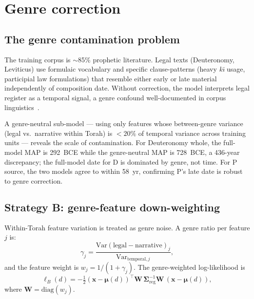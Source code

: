 \documentclass[10pt,letterpaper]{article}
\newcommand{\Smat}{\boldsymbol{\Sigma}}
\newcommand{\muvec}{\boldsymbol{\mu}}
\newcommand{\xvec}{\mathbf{x}}
\begin{document}
\section*{Genre correction}

\subsection*{The genre contamination problem}

The training corpus is $\sim$85\% prophetic literature.  Legal texts
(Deuteronomy, Leviticus) use formulaic vocabulary and specific
clause-patterns (heavy \textit{k\={\i}} usage, participial law formulations)
that resemble either early or late material independently of composition date.
Without correction, the model interprets legal register as a temporal signal, a genre confound well-documented in corpus linguistics~\cite{Biber1988,Biber2009}.

A genre-neutral sub-model --- using only features whose between-genre variance
(legal vs.\ narrative within Torah) is $< 20\%$ of temporal variance across
training units --- reveals the scale of contamination.  For Deuteronomy
whole, the full-model MAP is 292~BCE while the genre-neutral MAP is 728~BCE,
a 436-year discrepancy; the full-model date for D is dominated by genre,
not time.  For P source, the two models agree to within 58~yr, confirming
P's late date is robust to genre correction.

\subsection*{Strategy B: genre-feature down-weighting}

Within-Torah feature variation is treated as genre noise.  A genre ratio
per feature $j$ is:
%
\begin{equation}
  \gamma_j = \frac{\mathrm{Var}(\text{legal} - \text{narrative})_j}{
    \mathrm{Var}_{\text{temporal},j}},
\end{equation}
%
and the feature weight is $w_j = 1/(1 + \gamma_j)$.  The genre-weighted
log-likelihood is
%
\begin{equation}
  \ell_B(d) = -\tfrac{1}{2}
    (\xvec - \muvec(d))^\top \mathbf{W}\, \Smat_{\text{reg}}^{-1} \mathbf{W}\,
    (\xvec - \muvec(d)),
\end{equation}
%
where $\mathbf{W} = \mathrm{diag}(w_j)$.
\end{document}
